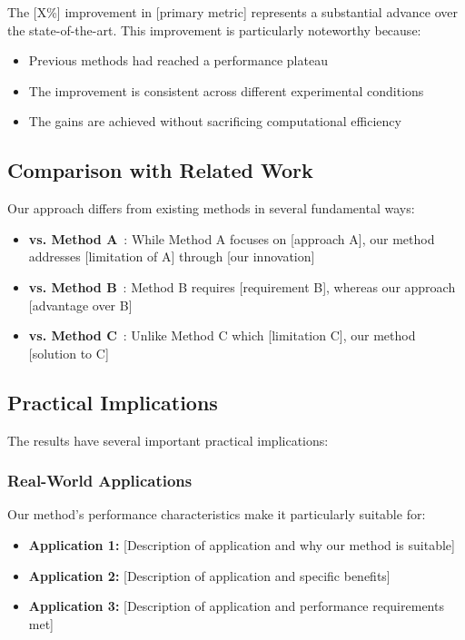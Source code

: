 The [X\%] improvement in [primary metric] represents a substantial advance over the state-of-the-art. This improvement is particularly noteworthy because:
\begin{itemize}
    \item Previous methods had reached a performance plateau
    \item The improvement is consistent across different experimental conditions
    \item The gains are achieved without sacrificing computational efficiency
\end{itemize}

\subsection{Comparison with Related Work}
\label{subsec:related_work}

Our approach differs from existing methods in several fundamental ways:

\begin{itemize}
    \item \textbf{vs. Method A}~\cite{methoda}: While Method A focuses on [approach A], our method addresses [limitation of A] through [our innovation]
    
    \item \textbf{vs. Method B}~\cite{methodb}: Method B requires [requirement B], whereas our approach [advantage over B]
    
    \item \textbf{vs. Method C}~\cite{methodc}: Unlike Method C which [limitation C], our method [solution to C]
\end{itemize}

\subsection{Practical Implications}
\label{subsec:practical}

The results have several important practical implications:

\subsubsection{Real-World Applications}

Our method's performance characteristics make it particularly suitable for:
\begin{itemize}
    \item \textbf{Application 1:} [Description of application and why our method is suitable]
    \item \textbf{Application 2:} [Description of application and specific benefits]
    \item \textbf{Application 3:} [Description of application and performance requirements met]
\end{itemize}

